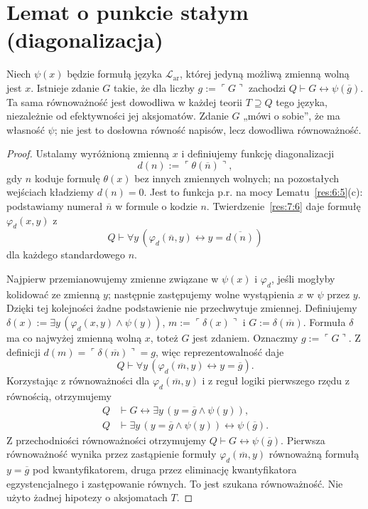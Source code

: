 \section{Lemat o punkcie stałym (diagonalizacja)}\label{sec:diagonalizacja}
\begin{lemat}\label{res:8:1}
Niech $\psi(x)$ będzie formułą języka $\mathcal L_{\mathrm{ar}}$,
której jedyną możliwą zmienną wolną jest $x$.
Istnieje zdanie $G$ takie, że dla liczby $g:=\ulcorner G\urcorner$
zachodzi $Q\vdash G\leftrightarrow\psi(\overline g)$.
Ta sama równoważność jest dowodliwa w każdej teorii
$T\supseteq Q$ tego języka, niezależnie od efektywności jej aksjomatów. Zdanie $G$ „mówi o sobie”, że ma własność $\psi$; nie jest to dosłowna równość napisów, lecz dowodliwa równoważność.
\end{lemat}
\begin{proof}
Ustalamy wyróżnioną zmienną $x$ i definiujemy funkcję diagonalizacji
\[
d(n):=\ulcorner\theta(\overline n)\urcorner,
\]
gdy $n$ koduje formułę $\theta(x)$ bez innych zmiennych wolnych; na pozostałych wejściach kładziemy $d(n)=0$. Jest to funkcja p.r. na mocy Lematu~\ref{res:6:5}(c): podstawiamy numerał $\overline n$ w formule o kodzie $n$. Twierdzenie~\ref{res:7:6} daje formułę $\varphi_d(x,y)$ z
\[
Q\vdash\forall y\,(\varphi_d(\overline n,y)\leftrightarrow y=\overline{d(n)})
\]
dla każdego standardowego $n$.

Najpierw przemianowujemy zmienne związane w $\psi(x)$
i $\varphi_d$, jeśli mogłyby kolidować ze zmienną $y$;
następnie zastępujemy wolne wystąpienia $x$ w $\psi$ przez $y$.
Dzięki tej kolejności żadne podstawienie nie przechwytuje zmiennej.
Definiujemy $\delta(x):=\exists y\,(\varphi_d(x,y)\land\psi(y))$,
$m:=\ulcorner\delta(x)\urcorner$ i $G:=\delta(\overline m)$.
Formuła $\delta$ ma co najwyżej zmienną wolną $x$, toteż
$G$ jest zdaniem. Oznaczmy $g:=\ulcorner G\urcorner$.
Z definicji $d(m)=\ulcorner\delta(\overline m)\urcorner=g$,
więc reprezentowalność daje
\[
Q\vdash\forall y\,(\varphi_d(\overline m,y)\leftrightarrow y=\overline g).
\]
Korzystając z równoważności dla $\varphi_d(\overline m,y)$
i z reguł logiki pierwszego rzędu z równością, otrzymujemy
\[
\begin{aligned}
Q&\vdash G\leftrightarrow\exists y\,(y=\overline g\land\psi(y)),\\
Q&\vdash \exists y\,(y=\overline g\land\psi(y))
\leftrightarrow\psi(\overline g).
\end{aligned}
\]
Z przechodniości równoważności otrzymujemy
$Q\vdash G\leftrightarrow\psi(\overline g)$.
Pierwsza równoważność wynika przez zastąpienie formuły
$\varphi_d(\overline m,y)$ równoważną formułą $y=\overline g$
pod kwantyfikatorem, druga przez eliminację kwantyfikatora
egzystencjalnego i zastępowanie równych.
To jest szukana równoważność. Nie użyto żadnej hipotezy o aksjomatach $T$.
\end{proof}




